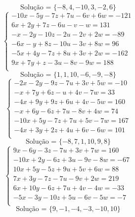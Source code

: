 \documentclass[12pt,oneside,a4paper]{article}
\begin{document}
\begin{equation*}
\text{Solução = }\{-8,4,-10,3,-2,6\}
\end{equation*}
\vspace{\baselineskip}
\begin{equation*}
\begin{cases}
-10x-5y-7z+7u-6v+6w=-121 \\
6x+2y+7z-6u-v-w=131 \\
-x-2y-10z-2u-2v+2w=-89 \\
-6x-y+8z-10u-3v+8w=96 \\
-5x+4y-7z+8u+3v+2w=-162 \\
9x+7y+z-3u-8v-9w=188 \\
\end{cases}
\end{equation*}
\begin{equation*}
\text{Solução = }\{1,1,10,-6,-9,-8\}
\end{equation*}
\vspace{\baselineskip}
\begin{equation*}
\begin{cases}
-2x-2y-9z-7u+3v+5w=-10 \\
-x+7y+6z-u+4v-7w=33 \\
-4x+9y+9z+6u+4v-5w=160 \\
-x+6y-6z+7u-8v+4w=74 \\
-10x+5y-7z+7u+5v-7w=167 \\
-4x+3y+2z+4u+6v-6w=101 \\
\end{cases}
\end{equation*}
\begin{equation*}
\text{Solução = }\{-8,7,1,10,9,8\}
\end{equation*}
\vspace{\baselineskip}
\begin{equation*}
\begin{cases}
9x-6y-3z-7u+3v+7w=160 \\
-10x+2y-6z+3u-9v-8w=-67 \\
10x+5y-5z+9u+5v+6w=88 \\
7x+3y-7z-7u-9v+2w=219 \\
6x+10y-6z+7u+4v-4w=-33 \\
-5x-3y-10z+5u-6v-5w=-7 \\
\end{cases}
\end{equation*}
\begin{equation*}
\text{Solução = }\{9,-1,-4,-3,-10,10\}
\end{equation*}
\end{document}
